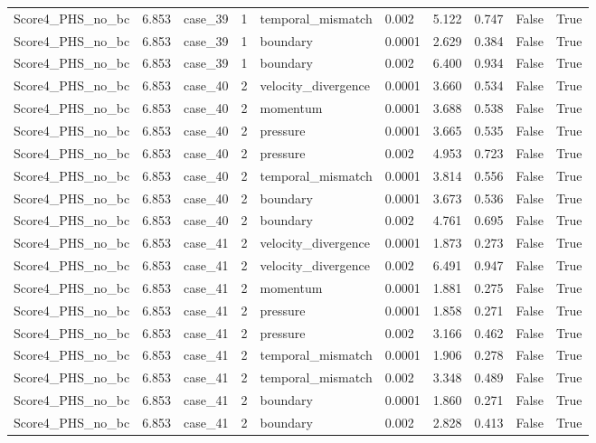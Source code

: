 \begin{longtable}{llllllllll}
Score4\_PHS\_no\_bc & 6.853 & case\_39 & 1 & temporal\_mismatch & 0.002 & 5.122 & 0.747 & False & True \\
Score4\_PHS\_no\_bc & 6.853 & case\_39 & 1 & boundary & 0.0001 & 2.629 & 0.384 & False & True \\
Score4\_PHS\_no\_bc & 6.853 & case\_39 & 1 & boundary & 0.002 & 6.400 & 0.934 & False & True \\
Score4\_PHS\_no\_bc & 6.853 & case\_40 & 2 & velocity\_divergence & 0.0001 & 3.660 & 0.534 & False & True \\
Score4\_PHS\_no\_bc & 6.853 & case\_40 & 2 & momentum & 0.0001 & 3.688 & 0.538 & False & True \\
Score4\_PHS\_no\_bc & 6.853 & case\_40 & 2 & pressure & 0.0001 & 3.665 & 0.535 & False & True \\
Score4\_PHS\_no\_bc & 6.853 & case\_40 & 2 & pressure & 0.002 & 4.953 & 0.723 & False & True \\
Score4\_PHS\_no\_bc & 6.853 & case\_40 & 2 & temporal\_mismatch & 0.0001 & 3.814 & 0.556 & False & True \\
Score4\_PHS\_no\_bc & 6.853 & case\_40 & 2 & boundary & 0.0001 & 3.673 & 0.536 & False & True \\
Score4\_PHS\_no\_bc & 6.853 & case\_40 & 2 & boundary & 0.002 & 4.761 & 0.695 & False & True \\
Score4\_PHS\_no\_bc & 6.853 & case\_41 & 2 & velocity\_divergence & 0.0001 & 1.873 & 0.273 & False & True \\
Score4\_PHS\_no\_bc & 6.853 & case\_41 & 2 & velocity\_divergence & 0.002 & 6.491 & 0.947 & False & True \\
Score4\_PHS\_no\_bc & 6.853 & case\_41 & 2 & momentum & 0.0001 & 1.881 & 0.275 & False & True \\
Score4\_PHS\_no\_bc & 6.853 & case\_41 & 2 & pressure & 0.0001 & 1.858 & 0.271 & False & True \\
Score4\_PHS\_no\_bc & 6.853 & case\_41 & 2 & pressure & 0.002 & 3.166 & 0.462 & False & True \\
Score4\_PHS\_no\_bc & 6.853 & case\_41 & 2 & temporal\_mismatch & 0.0001 & 1.906 & 0.278 & False & True \\
Score4\_PHS\_no\_bc & 6.853 & case\_41 & 2 & temporal\_mismatch & 0.002 & 3.348 & 0.489 & False & True \\
Score4\_PHS\_no\_bc & 6.853 & case\_41 & 2 & boundary & 0.0001 & 1.860 & 0.271 & False & True \\
Score4\_PHS\_no\_bc & 6.853 & case\_41 & 2 & boundary & 0.002 & 2.828 & 0.413 & False & True \\

\end{longtable}
